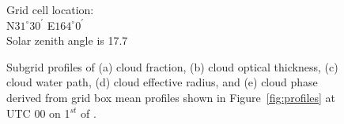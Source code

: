 \begin{figure}[!h]

  \begin{minipage}[c][4.5cm][c]{\textwidth}

    \begin{minipage}{0.3\textwidth}
    \end{minipage}\hfill
    \begin{minipage}{0.3\textwidth}
    \end{minipage}\hfill
    \begin{minipage}{0.3\textwidth}
    \end{minipage}

  \end{minipage}
  \begin{minipage}[c][4.5cm][c]{\textwidth}

    \begin{minipage}{0.3\textwidth}
        \begin{minipage}[c]{0.9\textwidth}
        Grid cell location: \\
        N$31^{\circ}30^{\prime}$ E$164^{\circ}0^{\prime}$\\
        Solar zenith angle is 17.7
        \end{minipage}
    \end{minipage}\hfill
    \begin{minipage}{0.3\textwidth}
    \end{minipage}\hfill
    \begin{minipage}{0.3\textwidth}
    \end{minipage}

  \end{minipage}
  \caption[Down-scaled cloud parameter profiles.]{Subgrid profiles 
      of (a) cloud fraction, (b) cloud optical thickness, (c) cloud water path,
      (d) cloud effective radius, and (e) cloud phase
      derived from grid box mean profiles shown in Figure~\ref{fig:profiles} 
  at UTC 00 on 1$^{st}$ of \MonthYear.}
  \label{fig:scops}
\end{figure}


